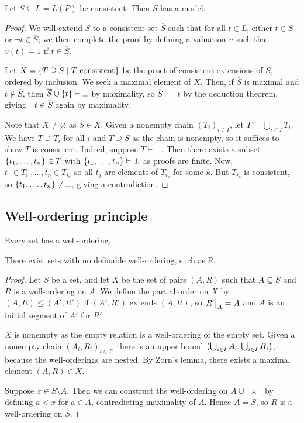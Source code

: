 \begin{theorem}
    Let \( S \subseteq L = L(P) \) be consistent.
    Then \( S \) has a model.
\end{theorem}
\begin{proof}
    We will extend \( S \) to a consistent set \( \overline S \) such that for all \( t \in L \), either \( t \in S \) or \( \neg t \in \overline S \); we then complete the proof by defining a valuation \( v \) such that \( v(t) = 1 \) if \( t \in \overline S \).

    Let \( X = \qty{T \supseteq S \mid T \text{ consistent}} \) be the poset of consistent extensions of \( S \), ordered by inclusion.
    We seek a maximal element of \( X \).
    Then, if \( \overline S \) is maximal and \( t \not\in \overline S \), then \( \overline S \cup \qty{t} \vdash \bot \) by maximality, so \( \overline S \vdash \neg t \) by the deduction theorem, giving \( \neg t \in \overline S \) again by maximality.

    Note that \( X \neq \varnothing \) as \( S \in X \).
    Given a nonempty chain \( (T_i)_{i \in I} \), let \( T = \bigcup_{i \in I} T_i \).
    We have \( T \supseteq T_i \) for all \( i \) and \( T \supseteq S \) as the chain is nonempty, so it suffices to show \( T \) is consistent.
    Indeed, suppose \( T \vdash \bot \).
    Then there exists a subset \( \qty{t_1, \dots, t_n} \in T \) with \( \qty{t_1, \dots, t_n} \vdash \bot \) as proofs are finite.
    Now, \( t_1 \in T_{i_1}, \dots, t_n \in T_{i_n} \) so all \( t_j \) are elements of \( T_{i_k} \) for some \( k \).
    But \( T_{i_k} \) is consistent, so \( \qty{t_1, \dots, t_n} \not\vdash \bot \), giving a contradiction.
\end{proof}

\subsection{Well-ordering principle}
\begin{theorem}
    Every set has a well-ordering.
\end{theorem}
There exist sets with no definable well-ordering, such as \( \mathbb R \).
\begin{proof}
    Let \( S \) be a set, and let \( X \) be the set of pairs \( (A, R) \) such that \( A \subseteq S \) and \( R \) is a well-ordering on \( A \).
    We define the partial order on \( X \) by \( (A, R) \leq (A', R') \) if \( (A', R') \) extends \( (A, R) \), so \( \eval{R'}_A = A \) and \( A \) is an initial segment of \( A' \) for \( R' \).

    \( X \) is nonempty as the empty relation is a well-ordering of the empty set.
    Given a nonempty chain \( (A_i, R_i)_{i \in I} \), there is an upper bound \( \qty(\bigcup_{i \in I} A_i, \bigcup_{i \in I} R_i) \), because the well-orderings are nested.
    By Zorn's lemma, there exists a maximal element \( (A, R) \in X \).

    Suppose \( x \in S \setminus A \).
    Then we can construct the well-ordering on \( A \cup \qty{x} \) by defining \( a < x \) for \( a \in A \), contradicting maximality of \( A \).
    Hence \( A = S \), so \( R \) is a well-ordering on \( S \).
\end{proof}

